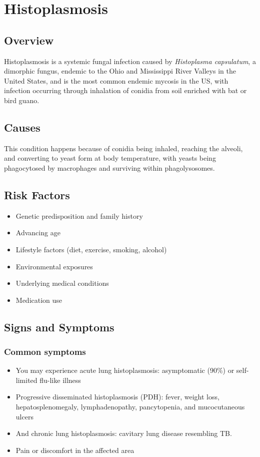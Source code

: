 \chapter{Histoplasmosis}
\label{sec:Histoplasmosis}

\section{Overview}
Histoplasmosis is a systemic fungal infection caused by \textit{Histoplasma capsulatum}, a dimorphic fungus, endemic to the Ohio and Mississippi River Valleys in the United States, and is the most common endemic mycosis in the US, with infection occurring through inhalation of conidia from soil enriched with bat or bird guano.
\section{Causes}
This condition happens because of conidia being inhaled, reaching the alveoli, and converting to yeast form at body temperature, with yeasts being phagocytosed by macrophages and surviving within phagolysosomes.     
\section{Risk Factors}

\begin{itemize}[noitemsep]
  \item Genetic predisposition and family history
  \item Advancing age
  \item Lifestyle factors (diet, exercise, smoking, alcohol)
  \item Environmental exposures
  \item Underlying medical conditions
  \item Medication use
\end{itemize}
\section{Signs and Symptoms}

\subsection{Common symptoms}
\begin{itemize}[noitemsep]
  \item You may experience acute lung histoplasmosis: asymptomatic (90\%) or self-limited flu-like illness
  \item Progressive disseminated histoplasmosis (PDH): fever, weight loss, hepatosplenomegaly, lymphadenopathy, pancytopenia, and mucocutaneous ulcers
  \item And chronic lung histoplasmosis: cavitary lung disease resembling TB.
  \item Pain or discomfort in the affected area
  \end{itemize}


